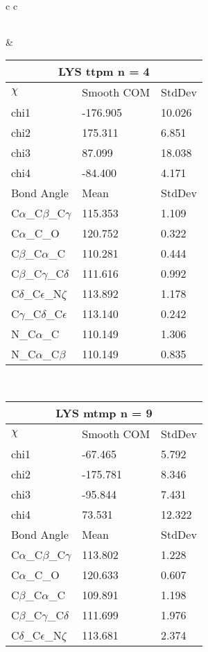 \begin{longtable}{ c c }
\begin{tabular}{ l l l }
  \bottomrule
  \end{tabular}
  &
  \begin{tabular}{ l l l }
  \toprule
  \multicolumn{3}{c}{LYS \textbf{ttpm} n = 4} \\ \toprule
  $\chi$       & Smooth COM & StdDev \\ \midrule
  chi1 & -176.905 & 10.026 \\ 
  chi2 & 175.311 & 6.851 \\ 
  chi3 & 87.099 & 18.038 \\ 
  chi4 & -84.400 & 4.171 \\ \midrule
  Bond Angle   & Mean     & StdDev \\ \midrule
  C$\alpha$\_C$\beta$\_C$\gamma$ & 115.353 & 1.109\\
  C$\alpha$\_C\_O & 120.752 & 0.322\\
  C$\beta$\_C$\alpha$\_C & 110.281 & 0.444\\
  C$\beta$\_C$\gamma$\_C$\delta$ & 111.616 & 0.992\\
  C$\delta$\_C$\epsilon$\_N$\zeta$ & 113.892 & 1.178\\
  C$\gamma$\_C$\delta$\_C$\epsilon$ & 113.140 & 0.242\\
  N\_C$\alpha$\_C & 110.149 & 1.306\\
  N\_C$\alpha$\_C$\beta$ & 110.149 & 0.835\\
  \bottomrule
  \end{tabular}
  \\
  \begin{tabular}{ l l l }
  \toprule
  \multicolumn{3}{c}{LYS \textbf{mtmp} n = 9} \\ \toprule
  $\chi$       & Smooth COM & StdDev \\ \midrule
  chi1 & -67.465 & 5.792 \\ 
  chi2 & -175.781 & 8.346 \\ 
  chi3 & -95.844 & 7.431 \\ 
  chi4 & 73.531 & 12.322 \\ \midrule
  Bond Angle   & Mean     & StdDev \\ \midrule
  C$\alpha$\_C$\beta$\_C$\gamma$ & 113.802 & 1.228\\
  C$\alpha$\_C\_O & 120.633 & 0.607\\
  C$\beta$\_C$\alpha$\_C & 109.891 & 1.198\\
  C$\beta$\_C$\gamma$\_C$\delta$ & 111.699 & 1.976\\
  C$\delta$\_C$\epsilon$\_N$\zeta$ & 113.681 & 2.374\\

\end{tabular}
\end{longtable}
